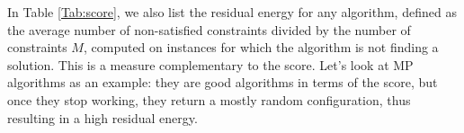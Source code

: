 \documentclass{article}
\begin{document}
In Table \ref{Tab:score}, we also list the residual energy for any algorithm, defined as the average number of non-satisfied constraints divided by the number of constraints $M$, computed on instances for which the algorithm is not finding a solution. This is a measure complementary to the score. Let's look at MP algorithms as an example: they are good algorithms in terms of the score, but once they stop working, they return a mostly random configuration, thus resulting in a high residual energy.

\begin{table}
\begin{center}
\begin{minipage}{0.502\textwidth}
\centering
{}
\end{minipage}
\end{center}
\end{table}
\end{document}

